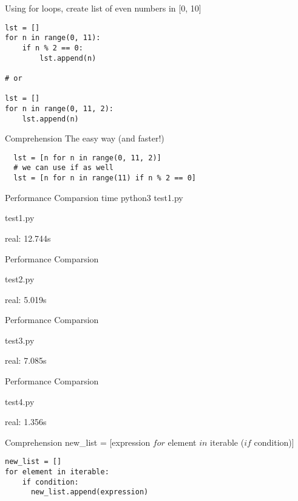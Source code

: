 \documentclass{beamer}
\begin{document}
\begin{frame}[fragile]
  Using for loops, create list of even numbers in [0, 10]
  \begin{lstlisting}
lst = []
for n in range(0, 11):
    if n % 2 == 0:
        lst.append(n)

# or

lst = []
for n in range(0, 11, 2):
    lst.append(n)
  \end{lstlisting}
\end{frame}

\begin{frame}[fragile]{Comprehension}
  The easy way (and faster!)
  \begin{lstlisting}
  lst = [n for n in range(0, 11, 2)]
  # we can use if as well
  lst = [n for n in range(11) if n % 2 == 0]
  \end{lstlisting}
\end{frame}

\begin{frame}[fragile]{Performance Comparsion}
  time python3 test1.py
  \begin{lstinputlisting}
  {test1.py}
  \end{lstinputlisting}
  real: 12.744s
\end{frame}

\begin{frame}[fragile]{Performance Comparsion}
  \begin{lstinputlisting}
  {test2.py}
  \end{lstinputlisting}
  real: 5.019s
\end{frame}

\begin{frame}[fragile]{Performance Comparsion}
  \begin{lstinputlisting}
  {test3.py}
  \end{lstinputlisting}
  real: 7.085s
\end{frame}

\begin{frame}[fragile]{Performance Comparsion}
  \begin{lstinputlisting}
  {test4.py}
  \end{lstinputlisting}
  real: 1.356s
\end{frame}

\begin{frame}[fragile]{Comprehension}
  new\_list = [expression $for$ element $in$ iterable ($if$ condition)]\\
  \begin{lstlisting}
new_list = []
for element in iterable:
    if condition:
      new_list.append(expression)
  \end{lstlisting}
\end{frame}
\end{document}
